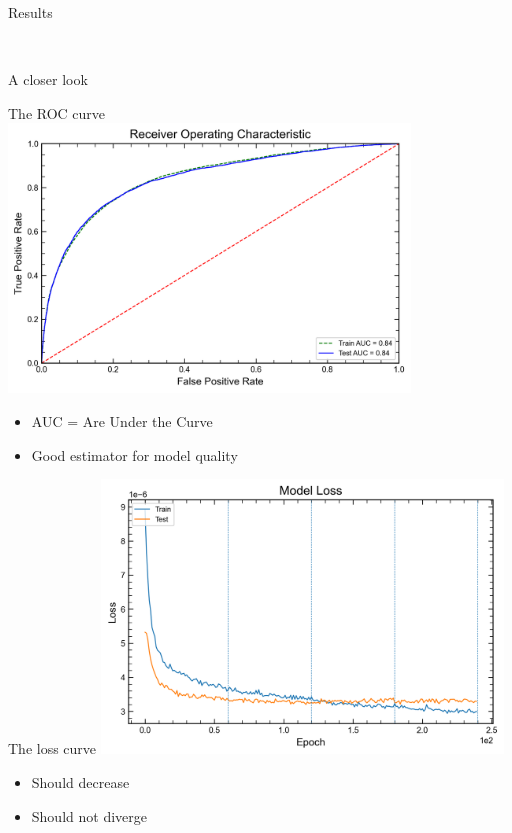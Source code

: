\begin{frame}{Results}
\begin{columns}
\begin{column}{0.5\textwidth}
        \end{column}
    \end{columns}    
\end{frame}

\begin{frame}
    \begin{center}
        \Huge \tHq \\ A closer look
    \end{center}
\end{frame}

\begin{frame}{The ROC curve}
  \centering \includegraphics[width=0.8\textwidth]{ROC_binary}
  \begin{itemize}
    \item AUC = Are Under the Curve
    \item Good estimator for model quality
  \end{itemize}
\end{frame}

\begin{frame}{The loss curve}
  \centering \includegraphics[width=0.8\textwidth]{loss_binary}
\begin{itemize}
  \item Should decrease
  \item Should not diverge
\end{itemize}
\end{frame}

